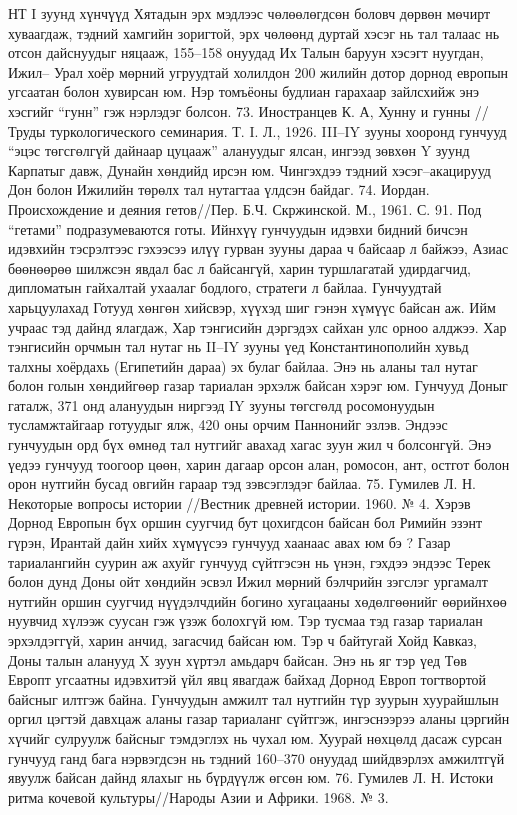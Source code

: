 НТ I зуунд хүнчүүд Хятадын эрх мэдлээс чөлөөлөгдсөн боловч дөрвөн мөчирт хуваагдаж, тэдний хамгийн зоригтой, эрх чөлөөнд дуртай хэсэг нь тал талаас нь отсон дайснуудыг няцааж, 155–158 онуудад Их Талын баруун хэсэгт нуугдан, Ижил– Урал хоёр мөрний угруудтай холилдон 200 жилийн дотор дорнод европын угсаатан болон хувирсан юм. Нэр томъёоны будлиан гарахаар зайлсхийж энэ хэсгийг “гунн” гэж нэрлэдэг болсон. 73. Иностранцев К. А, Хунну и гунны //Труды туркологического семинария. Т. I. Л., 1926.
III–IY зууны хооронд гунчууд “эцэс төгсгөлгүй дайнаар цуцааж” алануудыг ялсан, ингээд зөвхөн Y зуунд Карпатыг давж, Дунайн хөндийд ирсэн юм. Чингэхдээ тэдний хэсэг–акацирууд Дон болон Ижилийн төрөлх тал нутагтаа үлдсэн байдаг. 74. Иордан. Происхождение и деяния гетов//Пер. Б.Ч. Скржинской. М., 1961. С. 91. Под “гетами” подразумеваются готы.
Ийнхүү гунчуудын идэвхи бидний бичсэн идэвхийн тэсрэлтээс гэхээсээ илүү гурван зууны дараа ч байсаар л байжээ, Азиас бөөнөөрөө шилжсэн явдал бас л байсангүй, харин туршлагатай удирдагчид, дипломатын гайхалтай ухаалаг бодлого, стратеги л байлаа. Гунчуудтай харьцуулахад Готууд хөнгөн хийсвэр, хүүхэд шиг гэнэн хүмүүс байсан аж. Ийм учраас тэд дайнд ялагдаж, Хар тэнгисийн дэргэдэх сайхан улс орноо алджээ.
Хар тэнгисийн орчмын тал нутаг нь II–IY зууны үед Константинополийн хувьд талхны хоёрдахь (Египетийн дараа) эх булаг байлаа. Энэ нь аланы тал нутаг болон голын хөндийгөөр газар тариалан эрхэлж байсан хэрэг юм. Гунчууд Доныг гаталж, 371 онд алануудын ниргээд IY зууны төгсгөлд росомонуудын тусламжтайгаар готуудыг ялж, 420 оны орчим Паннонийг эзлэв. Эндээс гунчуудын орд бүх өмнөд тал нутгийг авахад хагас зуун жил ч болсонгүй. Энэ үедээ гунчууд тоогоор цөөн, харин дагаар орсон алан, ромосон, ант, остгот болон орон нутгийн бусад овгийн гараар тэд зэвсэглэдэг байлаа. 75. Гумилев Л. Н. Некоторые вопросы истории //Вестник древней истории. 1960. № 4.
Хэрэв Дорнод Европын бүх оршин суугчид бут цохигдсон байсан бол Римийн эзэнт гүрэн, Ирантай дайн хийх хүмүүсээ гунчууд хаанаас авах юм бэ ? Газар тариалангийн суурин аж ахуйг гунчууд сүйтгэсэн нь үнэн, гэхдээ эндээс Терек болон дунд Доны ойт хөндийн эсвэл Ижил мөрний бэлчрийн зэгслэг ургамалт нутгийн оршин суугчид нүүдэлчдийн богино хугацааны хөдөлгөөнийг өөрийнхөө нуувчид хүлээж суусан гэж үзэж болохгүй юм. Тэр тусмаа тэд газар тариалан эрхэлдэггүй, харин анчид, загасчид байсан юм. Тэр ч байтугай Хойд Кавказ, Доны талын аланууд X зуун хүртэл амьдарч байсан. Энэ нь яг тэр үед Төв Европт угсаатны идэвхитэй үйл явц явагдаж байхад Дорнод Европ тогтвортой байсныг илтгэж байна.
Гунчуудын амжилт тал нутгийн түр зуурын хуурайшлын оргил цэгтэй давхцаж аланы газар тариаланг сүйтгэж, ингэснээрээ аланы цэргийн хүчийг сулруулж байсныг тэмдэглэх нь чухал юм. Хуурай нөхцөлд дасаж сурсан гунчууд ганд бага нэрвэгдсэн нь тэдний 160–370 онуудад шийдвэрлэх амжилтгүй явуулж байсан дайнд ялахыг нь бүрдүүлж өгсөн юм. 76. Гумилев Л. Н. Истоки ритма кочевой культуры//Народы Азии и Африки. 1968. № 3.
